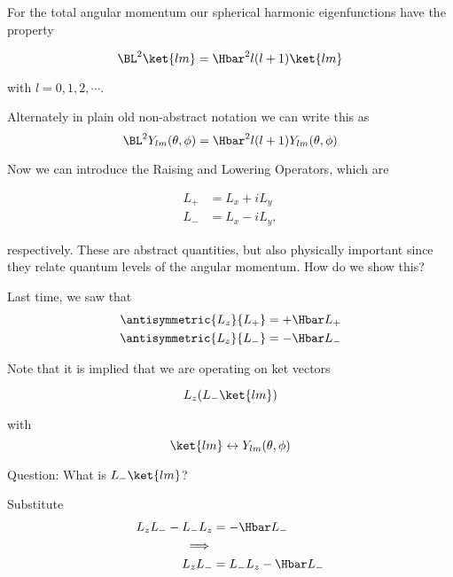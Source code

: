 For the total angular momentum our spherical harmonic eigenfunctions have the property

\begin{equation}\label{eqn:PHY356Foct19:1008}
\BL^2 \ket{lm} = \Hbar^2 l (l + 1)\ket{l m}
\end{equation}

with \(l = 0, 1, 2, \cdots\).

Alternately in plain old non-abstract notation we can write this as
\begin{equation}\label{eqn:PHY356Foct19:1009}
\BL^2 Y_{lm}(\theta, \phi) = \Hbar^2 l (l + 1) Y_{lm}(\theta, \phi)
\end{equation}

Now we can introduce the Raising and Lowering Operators, which are

\begin{equation}\label{eqn:PHY356Foct19:1010}
\begin{aligned}
L_{+} &= L_x + i L_y \\
L_{-} &= L_x - i L_y,
\end{aligned}
\end{equation}

respectively.  These are abstract quantities, but also physically important since they relate quantum levels of the angular momentum.  How do we show this?

Last time, we saw that
\begin{equation}\label{eqn:PHY356Foct19:1011}
\begin{aligned}
\antisymmetric{L_z}{L_{+}} &= +\Hbar L_{+} \\
\antisymmetric{L_z}{L_{-}} &= -\Hbar L_{-}
\end{aligned}
\end{equation}

Note that it is implied that we are operating on ket vectors

\begin{equation}\label{eqn:lecture6OrbitalandIntrinsicMomentum:2100}
L_z (L_{-} \ket{lm} )
\end{equation}

with
\begin{equation}\label{eqn:PHY356Foct19:1012}
\ket{lm} \leftrightarrow Y_{lm}(\theta, \phi)
\end{equation}

Question: What is \(L_{-} \ket{lm}\)?

Substitute
\begin{equation}\label{eqn:lecture6OrbitalandIntrinsicMomentum:2120}
\begin{aligned}
L_z L_{-} - L_{-} L_z &= - \Hbar L_{-} \\
\implies \\
L_z L_{-} &= L_{-} L_z - \Hbar L_{-}
\end{aligned}
\end{equation}

